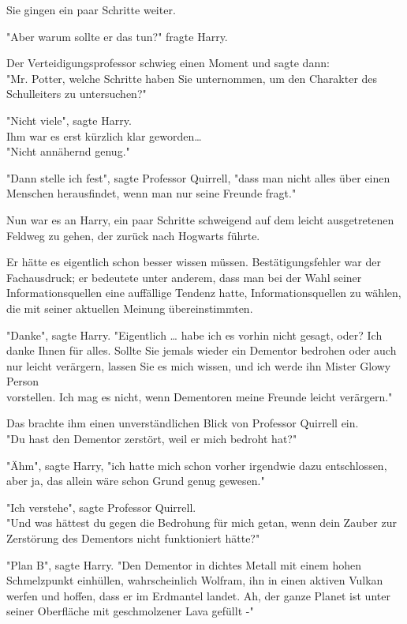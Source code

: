 {Sie gingen ein paar Schritte weiter.

"Aber warum sollte er das tun?" fragte Harry.

Der Verteidigungsprofessor schwieg einen Moment und sagte dann:\\ "Mr. Potter, welche Schritte haben Sie unternommen, um den Charakter des Schulleiters zu untersuchen?"

"Nicht viele", sagte Harry.\\ Ihm war es erst kürzlich klar geworden…\\ "Nicht annähernd genug."

"Dann stelle ich fest", sagte Professor Quirrell, "dass man nicht alles über einen Menschen herausfindet, wenn man nur seine Freunde fragt."

Nun war es an Harry, ein paar Schritte schweigend auf dem leicht ausgetretenen Feldweg zu gehen, der zurück nach Hogwarts führte.

Er hätte es eigentlich schon besser wissen müssen. Bestätigungsfehler war der Fachausdruck; er bedeutete unter anderem, dass man bei der Wahl seiner Informationsquellen eine auffällige Tendenz hatte, Informationsquellen zu wählen, die mit seiner aktuellen Meinung übereinstimmten.

"Danke", sagte Harry. "Eigentlich … habe ich es vorhin nicht gesagt, oder? Ich danke Ihnen für alles. Sollte Sie jemals wieder ein Dementor bedrohen oder auch nur leicht verärgern, lassen Sie es mich wissen, und ich werde ihn Mister Glowy Person\\ vorstellen. Ich mag es nicht, wenn Dementoren meine Freunde leicht verärgern."

Das brachte ihm einen unverständlichen Blick von Professor Quirrell ein.\\ "Du hast den Dementor zerstört, weil er mich bedroht hat?"

"Ähm", sagte Harry, "ich hatte mich schon vorher irgendwie dazu entschlossen, aber ja, das allein wäre schon Grund genug gewesen."

"Ich verstehe", sagte Professor Quirrell.\\ "Und was hättest du gegen die Bedrohung für mich getan, wenn dein Zauber zur Zerstörung des Dementors nicht funktioniert hätte?"

"Plan B", sagte Harry. "Den Dementor in dichtes Metall mit einem hohen Schmelzpunkt einhüllen, wahrscheinlich Wolfram, ihn in einen aktiven Vulkan werfen und hoffen, dass er im Erdmantel landet. Ah, der ganze Planet ist unter seiner Oberfläche mit geschmolzener Lava gefüllt -"

}
